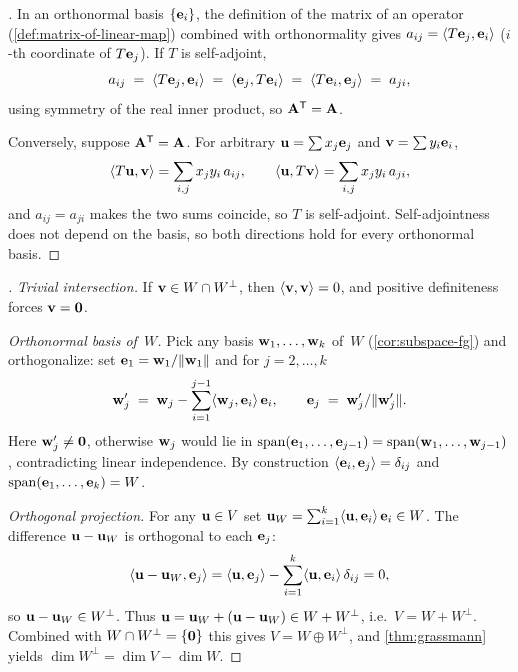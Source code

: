 \begin{proof}[]
In an orthonormal basis $\{\mathbf{e}_i\}$, the definition of the matrix
of an operator (\cref{def:matrix-of-linear-map}) combined with
orthonormality gives
$a_{ij} = \langle T\mathbf{e}_j, \mathbf{e}_i \rangle$ ($i$-th coordinate
of $T\mathbf{e}_j$). If $T$ is self-adjoint,
\[
  a_{ij} \;=\; \langle T\mathbf{e}_j, \mathbf{e}_i \rangle
  \;=\; \langle \mathbf{e}_j, T\mathbf{e}_i \rangle
  \;=\; \langle T\mathbf{e}_i, \mathbf{e}_j \rangle
  \;=\; a_{ji},
\]
using symmetry of the real inner product, so $\mathbf{A}^{\mathsf{T}} = \mathbf{A}$.

Conversely, suppose $\mathbf{A}^{\mathsf{T}} = \mathbf{A}$. For arbitrary
$\mathbf{u} = \sum x_j \mathbf{e}_j$ and $\mathbf{v} = \sum y_i \mathbf{e}_i$,
\[
  \langle T\mathbf{u}, \mathbf{v} \rangle = \sum_{i, j} x_j y_i\, a_{ij},
  \qquad
  \langle \mathbf{u}, T\mathbf{v} \rangle = \sum_{i, j} x_j y_i\, a_{ji},
\]
and $a_{ij} = a_{ji}$ makes the two sums coincide, so $T$ is
self-adjoint. Self-adjointness does not depend on the basis, so both
directions hold for every orthonormal basis.
\end{proof}

\begin{proof}[]
\emph{Trivial intersection.} If $\mathbf{v} \in W \cap W^{\perp}$, then
$\langle \mathbf{v}, \mathbf{v} \rangle = 0$, and positive definiteness
forces $\mathbf{v} = \mathbf{0}$.

\emph{Orthonormal basis of~$W$.} Pick any basis
$\mathbf{w}_1, \dots, \mathbf{w}_k$ of~$W$ (\cref{cor:subspace-fg}) and
orthogonalize: set $\mathbf{e}_1 = \mathbf{w}_1 / \|\mathbf{w}_1\|$ and for
$j = 2, \dots, k$
\[
  \mathbf{w}'_j \;=\; \mathbf{w}_j - \sum_{i=1}^{j-1} \langle \mathbf{w}_j, \mathbf{e}_i \rangle\, \mathbf{e}_i,
  \qquad
  \mathbf{e}_j \;=\; \mathbf{w}'_j / \|\mathbf{w}'_j\|.
\]
Here $\mathbf{w}'_j \neq \mathbf{0}$, otherwise $\mathbf{w}_j$ would lie in
$\operatorname{span}(\mathbf{e}_1, \dots, \mathbf{e}_{j-1}) = \operatorname{span}(\mathbf{w}_1, \dots, \mathbf{w}_{j-1})$,
contradicting linear independence. By construction
$\langle \mathbf{e}_i, \mathbf{e}_j \rangle = \delta_{ij}$ and
$\operatorname{span}(\mathbf{e}_1, \dots, \mathbf{e}_k) = W$.

\emph{Orthogonal projection.} For any $\mathbf{u} \in V$ set
$\mathbf{u}_W = \sum_{i=1}^{k} \langle \mathbf{u}, \mathbf{e}_i \rangle\, \mathbf{e}_i \in W$.
The difference $\mathbf{u} - \mathbf{u}_W$ is orthogonal to each
$\mathbf{e}_j$:
\[
  \langle \mathbf{u} - \mathbf{u}_W, \mathbf{e}_j \rangle
  = \langle \mathbf{u}, \mathbf{e}_j \rangle - \sum_{i=1}^{k} \langle \mathbf{u}, \mathbf{e}_i \rangle\, \delta_{ij}
  = 0,
\]
so $\mathbf{u} - \mathbf{u}_W \in W^{\perp}$. Thus
$\mathbf{u} = \mathbf{u}_W + (\mathbf{u} - \mathbf{u}_W) \in W + W^{\perp}$,
i.e.\ $V = W + W^{\perp}$. Combined with $W \cap W^{\perp} = \{\mathbf{0}\}$
this gives $V = W \oplus W^{\perp}$, and \cref{thm:grassmann} yields
$\dim W^{\perp} = \dim V - \dim W$.
\end{proof}

